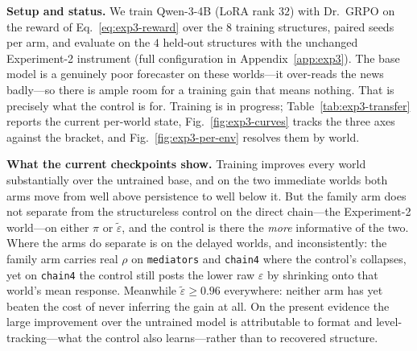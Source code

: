 

\textbf{Setup and status.}  We train Qwen-3-4B (LoRA rank $32$) with Dr.\ GRPO on the reward of
Eq.~\eqref{eq:exp3-reward} over the $8$ training structures, paired seeds per arm, and evaluate on the
$4$ held-out structures with the unchanged Experiment-2 instrument (full configuration in
Appendix~\ref{app:exp3}). The base model is a genuinely poor forecaster on these worlds---it over-reads
the news badly---so there is ample room for a training gain that means nothing. That is precisely what
the control is for. Training is in progress; Table~\ref{tab:exp3-transfer} reports the current
per-world state, Fig.~\ref{fig:exp3-curves} tracks the three axes against the bracket, and
Fig.~\ref{fig:exp3-per-env} resolves them by world.

\textbf{What the current checkpoints show.}  Training improves every world substantially over the
untrained base, and on the two immediate worlds both arms move from well above persistence to well below
it. But the family arm does not separate from the structureless control on the direct chain---the
Experiment-2 world---on either $\pi$ or $\tilde\varepsilon$, and the control is there the \emph{more}
informative of the two. Where the arms do separate is on the delayed worlds, and inconsistently: the
family arm carries real $\rho$ on \texttt{mediators} and \texttt{chain4} where the control's collapses,
yet on \texttt{chain4} the control still posts the lower raw $\varepsilon$ by shrinking onto that
world's mean response. Meanwhile $\tilde\varepsilon\geq0.96$ everywhere: neither arm has yet beaten the
cost of never inferring the gain at all. On the present evidence the large improvement over the
untrained model is attributable to format and level-tracking---what the control also learns---rather
than to recovered structure.

\begin{table}[h]
\centering
\caption{Synthetic arm --- \textbf{transfer across structure, per held-out world}. Qwen-3-4B trained with
Dr.\ GRPO on the $8$ training structures (family) and, identically, on structureless data (control), read
on the $4$ held-out structures with the Experiment~2 four-shock instrument at each world's $h^\star$;
paired seeds, bold marks the better arm on $\pi$. $\tilde\varepsilon$ is the recovery error relative to
that world's blind floor (Eq.~\eqref{eq:exp3-epstilde}): $\tilde\varepsilon<1$ means inferring $g$ beat
\emph{not} inferring it. \textbf{There is deliberately no pooled row}: $\pi$ would be dominated by the
delayed worlds and raw $\varepsilon$ would average incommensurable scales. Two readings matter. First,
$\tilde\varepsilon\geq0.96$ everywhere---neither arm clears the blind floor on any world. Second,
\texttt{chain4} is the reason $\varepsilon$ and $\rho$ must be read together: the control attains the
\emph{lower} raw $\varepsilon$ there while its $\rho$ collapses to $.081$, because it shrinks
$\hat\gamma$ onto that world's small mean response---calibrated but blind, exactly the solution the
reward was built to exclude. \emph{[Runs in flight; generated by \texttt{make\_tables.py}.]}}
\label{tab:exp3-transfer}
\footnotesize

\end{table}

